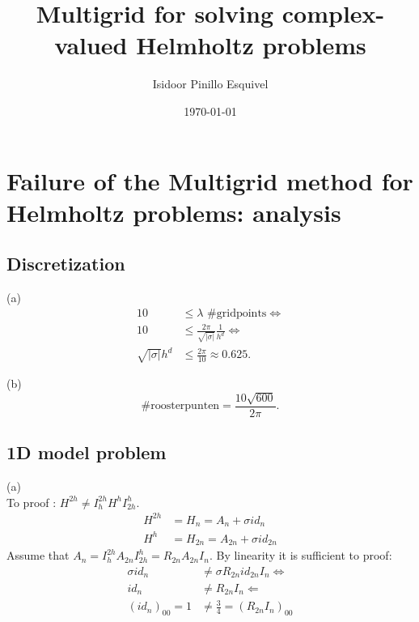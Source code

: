 \documentclass[a4paper,12pt]{article}
\begin{document}
\title{Multigrid for solving complex-valued Helmholtz problems}
\author{Isidoor Pinillo Esquivel}
\date{\today}
\maketitle

\section{Failure of the Multigrid method for Helmholtz problems: analysis}

\subsection{Discretization}
(a)
\begin{align*}
    10                    & \leq \lambda \text{ \#gridpoints} \Leftrightarrow                \\
    10                    & \leq \frac{2\pi}{\sqrt{|\sigma|}} \frac{1}{h^{d}}\Leftrightarrow \\
    \sqrt{|\sigma|} h^{d} & \leq \frac{2 \pi}{10} \approx 0.625.
\end{align*}

(b)
\[
    \text{\# roosterpunten} = \frac{10 \sqrt{600}}{2 \pi}
    .\]

\subsection{1D model problem}
(a) \\
To proof : $H^{2 h} \neq I_h^{2 h} H^h I_{2 h}^h$.
\begin{align*}
    H^{2h} & = H_n = A_n +\sigma {id}_n          \\
    H^{h}  & = H_{2n} = A_{2n} +\sigma {id}_{2n}
\end{align*}
Assume that $A_n =I_h^{2 h} A_{2n} I_{2 h}^h= R_{2n} A_{2n} I_n$. By linearity it is  sufficient
to proof:
\begin{align*}
    \sigma {id}_n  & \neq \sigma R_{2n} {id}_{2n} I_{n} \Leftrightarrow \\
    {id}_n         & \neq R_{2n} I_{n} \Leftarrow                       \\
    (id_n)_{00} =1 & \neq \frac{3}{4} = (R_{2n} I_{n})_{00}
\end{align*}
\end{document}
